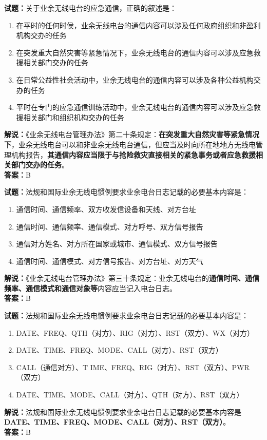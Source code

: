 \documentclass{ctexbook}
\begin{document}
\bigskip


\noindent\textbf{试题：}关于业余无线电台的应急通信，正确的叙述是：
\begin{enumerate}[leftmargin=3em]
\item 在平时的任何时侯，业余无线电台的通信内容可以涉及任何政府组织和非盈利机构交办的任务
\item 在突发重大自然灾害等紧急情况下，业余无线电台的通信内容可以涉及应急救援相关部门交办的任务
\item 在日常公益性社会活动中，业余无线电台的通信内容可以涉及各种公益机构交办的任务
\item 平时在专门的应急通信训练活动中，业余无线电台的通信内容可以涉及应急救援相关部门和组织机构交办的任务
\end{enumerate}
\noindent\textbf{解说：}《业余无线电台管理办法》第二十条规定：\textbf{在突发重大自然灾害等紧急情况下}，业余无线电台可以和非业余无线电台通信，但应当及时向所在地地方无线电管理机构报告，\textbf{其通信内容应当限于与抢险救灾直接相关的紧急事务或者应急救援相关部门交办的任务}。\\\noindent\textbf{答案：}B




\bigskip


\noindent\textbf{试题：}法规和国际业余无线电惯例要求业余电台日志记载的必要基本内容是：
\begin{enumerate}[leftmargin=3em]
\item 通信时间、通信频率、双方收发信设备和天线、对方台址
\item 通信时间、通信频率、通信模式、对方呼号、双方信号报告
\item 通信对方姓名、对方所在国家或城市、通信模式、双方信号报告
\item 通信时间、通信模式、对方信号报告、对方台址、对方天气
\end{enumerate}
\noindent\textbf{解说：}《业余无线电台管理办法》第三十条规定：业余无线电台的\textbf{通信时间、通信频率、通信模式和通信对象等}内容应当记入电台日志。\\\noindent\textbf{答案：}B




\bigskip


\noindent\textbf{试题：}法规和国际业余无线电惯例要求业余电台日志记载的必要基本内容是：
\begin{enumerate}[leftmargin=3em]
\item DATE、FREQ、QTH（对方）、RIG（对方）、RST（双方）、WX（对方）
\item DATE、TIME、FREQ、MODE、CALL（对方）、RST（双方）
\item CALL（通信对方）、T IME、FREQ、RIG（对方）、RST（双方）、PWR（双方）
\item DATE、TIME、MODE、CALL（对方）、QTH（对方）、RST（双方）
\end{enumerate}
\noindent\textbf{解说：}法规和国际业余无线电惯例要求业余电台日志记载的必要基本内容是\textbf{DATE、TIME、FREQ、MODE、CALL（对方）、RST（双方）}。\\\noindent\textbf{答案：}B
\end{document}
